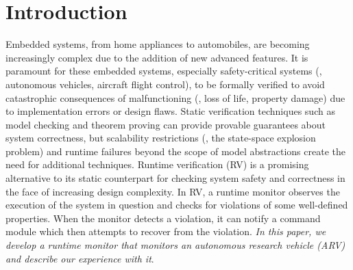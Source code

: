 \section{Introduction}
Embedded systems, from home appliances to automobiles, are becoming increasingly complex due to the addition of new advanced features. 
It is paramount for these embedded systems, especially safety-critical systems (\eg, autonomous vehicles, aircraft flight control), to be formally verified to avoid catastrophic consequences of malfunctioning (\eg, loss of life, property damage) due to implementation errors or design flaws. 
Static verification techniques such as model checking \cite{Clarke1996} and theorem proving \cite{Chang1997} can provide provable guarantees about system correctness, but scalability restrictions (\ie, the state-space explosion problem) and runtime failures beyond the scope of model abstractions \cite{Koopman2011} create the need for additional techniques.
Runtime verification (RV) is a promising alternative to its static counterpart for checking system safety and correctness in the face of increasing design complexity. 
In RV, a runtime monitor observes the execution of the system in question and checks for violations of some well-defined properties. 
When the monitor detects a violation, it can notify a command module which then attempts to recover from the violation. \emph{In this paper, we develop a runtime monitor that monitors an autonomous research vehicle (ARV) and describe our experience with it}.

